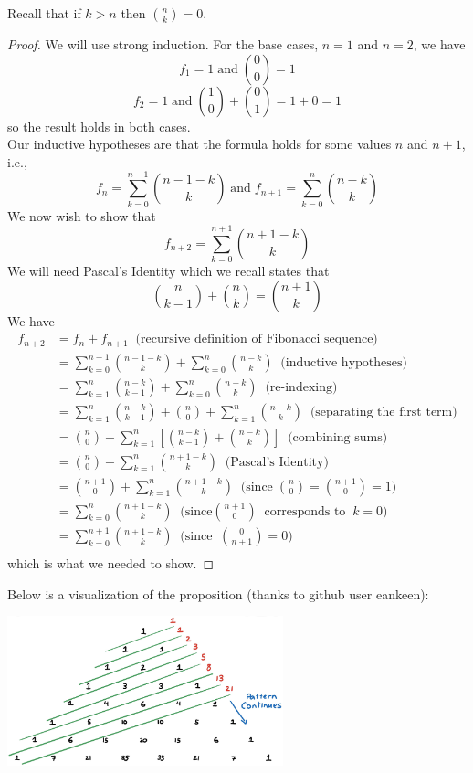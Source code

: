 \documentclass[handout]{ximera}
\begin{document}
\begin{remark}
Recall that if $k>n$ then $\binom{n}{k} = 0$.
\end{remark}

\begin{proof}
We will use strong induction. For the base cases, $n=1$ and $n=2$, we have
\[
f_1 =1  \; \text{and} \; \binom{0}{0} = 1 
\]
\[
f_2 =  1 \; \text{and} \; 
\binom{1}{0} + \binom{0}{1} = 1 + 0 = 1
\]
so the result holds in both cases.\\
Our inductive hypotheses are that the formula holds for some values $n$ and $n+1$, i.e., 
\[
f_n = \sum_{k=0}^{n-1} \binom{n-1-k}{k}  \;\text{and}\; f_{n+1} = \sum_{k=0}^{n} \binom{n-k}{k}
\]
We now wish to show that
\[
f_{n+2} = \sum_{k=0}^{n+1} \binom{n+1-k}{k}
\]
We will need Pascal's Identity  which we recall states that
\[
 \binom{n}{k-1}+ \binom{n}{k}=\binom{n+1}{k}
\]
We have
\begin{align*}
f_{n+2} &= f_n + f_{n+1}\;\; \text{(recursive definition of Fibonacci sequence)}\\
        &= \sum_{k=0}^{n-1} \binom{n-1-k}{k}  + \sum_{k=0}^{n} \binom{n-k}{k} \;\;\text{(inductive hypotheses)}\\
        &= \sum_{k=1}^{n} \binom{n-k}{k-1}  + \sum_{k=0}^{n} \binom{n-k}{k} \;\;\text{(re-indexing)}\\
        &= \sum_{k=1}^{n} \binom{n-k}{k-1}  + \binom{n}{0} + \sum_{k=1}^{n} \binom{n-k}{k} \;\;\text{(separating the first term)}\\
        &= \binom{n}{0} + \sum_{k=1}^{n} \left[\binom{n-k}{k-1} + \binom{n-k}{k} \right] \;\;\text{(combining sums)}\\
        &= \binom{n}{0} + \sum_{k=1}^{n} \binom{n+1-k}{k} \;\;\text{(Pascal's Identity)}\\
        &= \binom{n+1}{0} + \sum_{k=1}^{n} \binom{n+1-k}{k} \;\;\text{(since} \;\binom{n}{0} = \binom{n+1}{0} = 1)\\
         &= \sum_{k=0}^{n} \binom{n+1-k}{k}\;\;\text{(since} \binom{n+1}{0} \;\; \text{corresponds to} \;\; k = 0) \\
         &= \sum_{k=0}^{n+1} \binom{n+1-k}{k} \;\;\text{(since} \;\; \binom{0}{n+1} = 0)\\
\end{align*} 
which is what we needed to show.
\end{proof}
Below is a visualization of the proposition (thanks to github user eankeen):


\begin{image}
\includegraphics[width=0.6\textwidth]{pascalfibonacci.jpg}
\end{image}
\end{document}
